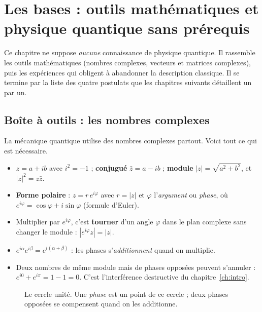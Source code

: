 \chapter{Les bases : outils mathématiques et physique quantique sans prérequis}\label{ch:bases}

Ce chapitre ne suppose \emph{aucune} connaissance de physique quantique. Il rassemble les outils mathématiques (nombres complexes, vecteurs et matrices complexes), puis les expériences qui obligent à abandonner la description classique. Il se termine par la liste des quatre postulats que les chapitres suivants détaillent un par un.

\section{Boîte à outils : les nombres complexes}
La mécanique quantique utilise des nombres complexes partout. Voici tout ce qui est nécessaire.
\begin{itemize}
\item $z=a+ib$ avec $i^2=-1$ ; \textbf{conjugué} $\bar z=a-ib$ ; \textbf{module} $|z|=\sqrt{a^2+b^2}$, et $|z|^2=z\bar z$.
\item \textbf{Forme polaire} : $z=r\,e^{i\varphi}$ avec $r=|z|$ et $\varphi$ l'\emph{argument} ou \emph{phase}, où $e^{i\varphi}=\cos\varphi+i\sin\varphi$ (formule d'Euler).
\item Multiplier par $e^{i\varphi}$, c'est \textbf{tourner} d'un angle $\varphi$ dans le plan complexe sans changer le module : $|e^{i\varphi}z|=|z|$.
\item $e^{i\alpha}e^{i\beta}=e^{i(\alpha+\beta)}$ : les phases s'\emph{additionnent} quand on multiplie.
\item Deux nombres de même module mais de phases opposées peuvent s'annuler : $e^{i0}+e^{i\pi}=1-1=0$. C'est l'interférence destructive du chapitre~\ref{ch:intro}.
\end{itemize}
\begin{figure}[htbp]
\centering
{}
\caption{Le cercle unité. Une \emph{phase} est un point de ce cercle ; deux phases opposées se compensent quand on les additionne.}
\end{figure}

